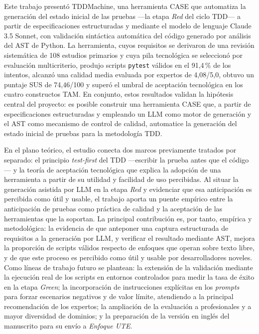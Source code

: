 \documentclass[10pt,journal,twoside,letterpaper]{IEEEtran}
\begin{document}
	Este trabajo presentó TDDMachine, una herramienta CASE que automatiza la generación del estado inicial de las pruebas ---la etapa \emph{Red} del ciclo TDD--- a partir de especificaciones estructuradas y mediante el modelo de lenguaje Claude 3.5 Sonnet, con validación sintáctica automática del código generado por análisis del AST de Python. La herramienta, cuyos requisitos se derivaron de una revisión sistemática de 108 estudios primarios y cuya pila tecnológica se seleccionó por evaluación multicriterio, produjo scripts \texttt{pytest} válidos en el 91,4\,\% de los intentos, alcanzó una calidad media evaluada por expertos de 4,08/5,0, obtuvo un puntaje SUS de 74,46/100 y superó el umbral de aceptación tecnológica en los cuatro constructos TAM. En conjunto, estos resultados validan la hipótesis central del proyecto: es posible construir una herramienta CASE que, a partir de especificaciones estructuradas y empleando un LLM como motor de generación y el AST como mecanismo de control de calidad, automatice la generación del estado inicial de pruebas para la metodología TDD.

	En el plano teórico, el estudio conecta dos marcos previamente tratados por separado: el principio \emph{test-first} del TDD ---escribir la prueba antes que el código--- y la teoría de aceptación tecnológica que explica la adopción de una herramienta a partir de su utilidad y facilidad de uso percibidas. Al situar la generación asistida por LLM en la etapa \emph{Red} y evidenciar que esa anticipación es percibida como útil y usable, el trabajo aporta un puente empírico entre la anticipación de pruebas como práctica de calidad y la aceptación de las herramientas que la soportan. La principal contribución es, por tanto, empírica y metodológica: la evidencia de que anteponer una captura estructurada de requisitos a la generación por LLM, y verificar el resultado mediante AST, mejora la proporción de scripts válidos respecto de enfoques que operan sobre texto libre, y de que este proceso es percibido como útil y usable por desarrolladores noveles. Como líneas de trabajo futuro se plantean: la extensión de la validación mediante la ejecución real de los scripts en entornos controlados para medir la tasa de éxito en la etapa \emph{Green}; la incorporación de instrucciones explícitas en los \emph{prompts} para forzar escenarios negativos y de valor límite, atendiendo a la principal recomendación de los expertos; la ampliación de la evaluación a profesionales y a mayor diversidad de dominios; y la preparación de la versión en inglés del manuscrito para su envío a \emph{Enfoque UTE}.
\end{document}
